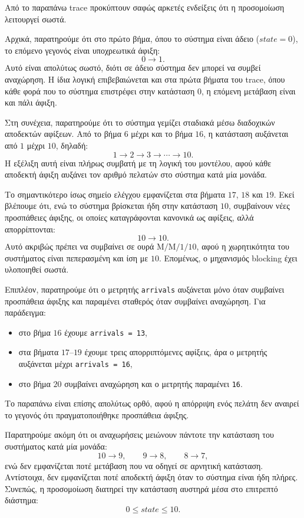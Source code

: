 \documentclass{article}
\begin{document}
Από το παραπάνω \foreignlanguage{english}{trace} προκύπτουν σαφώς αρκετές ενδείξεις ότι η προσομοίωση λειτουργεί σωστά.

Αρχικά, παρατηρούμε ότι στο πρώτο βήμα, όπου το σύστημα είναι άδειο ($state = 0$), το επόμενο γεγονός είναι υποχρεωτικά άφιξη:
\[
0 \to 1.
\]
Αυτό είναι απολύτως σωστό, διότι σε άδειο σύστημα δεν μπορεί να συμβεί αναχώρηση. Η ίδια λογική επιβεβαιώνεται και στα πρώτα βήματα του \foreignlanguage{english}{trace}, όπου κάθε φορά που το σύστημα επιστρέφει στην κατάσταση $0$, η επόμενη μετάβαση είναι και πάλι άφιξη.

Στη συνέχεια, παρατηρούμε ότι το σύστημα γεμίζει σταδιακά μέσω διαδοχικών αποδεκτών αφίξεων. Από το βήμα $6$ μέχρι και το βήμα $16$, η κατάσταση αυξάνεται από $1$ μέχρι $10$, δηλαδή:
\[
1 \to 2 \to 3 \to \cdots \to 10.
\]
Η εξέλιξη αυτή είναι πλήρως συμβατή με τη λογική του μοντέλου, αφού κάθε αποδεκτή άφιξη αυξάνει τον αριθμό πελατών στο σύστημα κατά μία μονάδα.

Το σημαντικότερο ίσως σημείο ελέγχου εμφανίζεται στα βήματα $17$, $18$ και $19$. Εκεί βλέπουμε ότι, ενώ το σύστημα βρίσκεται ήδη στην κατάσταση $10$, συμβαίνουν νέες προσπάθειες άφιξης, οι οποίες καταγράφονται κανονικά ως αφίξεις, αλλά απορρίπτονται:
\[
10 \to 10.
\]
Αυτό ακριβώς πρέπει να συμβαίνει σε ουρά $\mathrm{M/M/1/10}$, αφού η χωρητικότητα του συστήματος είναι πεπερασμένη και ίση με $10$. Επομένως, ο μηχανισμός \foreignlanguage{english}{blocking} έχει υλοποιηθεί σωστά.

Επιπλέον, παρατηρούμε ότι ο μετρητής \texttt{arrivals} αυξάνεται μόνο όταν συμβαίνει προσπάθεια άφιξης και παραμένει σταθερός όταν συμβαίνει αναχώρηση. Για παράδειγμα:

\begin{itemize}
    \item στο βήμα $16$ έχουμε \texttt{arrivals = 13},
    \item στα βήματα $17$--$19$ έχουμε τρεις απορριπτόμενες αφίξεις, άρα ο μετρητής αυξάνεται μέχρι \texttt{arrivals = 16},
    \item στο βήμα $20$ συμβαίνει αναχώρηση και ο μετρητής παραμένει \texttt{16}.
\end{itemize}

Το παραπάνω είναι επίσης απολύτως ορθό, αφού η απόρριψη ενός πελάτη δεν αναιρεί το γεγονός ότι πραγματοποιήθηκε προσπάθεια άφιξης.

Παρατηρούμε ακόμη ότι οι αναχωρήσεις μειώνουν πάντοτε την κατάσταση του συστήματος κατά μία μονάδα:
\[
10 \to 9,\qquad 9 \to 8,\qquad 8 \to 7,
\]
ενώ δεν εμφανίζεται ποτέ μετάβαση που να οδηγεί σε αρνητική κατάσταση. Αντίστοιχα, δεν εμφανίζεται ποτέ αποδεκτή άφιξη όταν το σύστημα είναι ήδη πλήρες. Συνεπώς, η προσομοίωση διατηρεί την κατάσταση αυστηρά μέσα στο επιτρεπτό διάστημα:
\[
0 \leq state \leq 10.
\]
\end{document}
